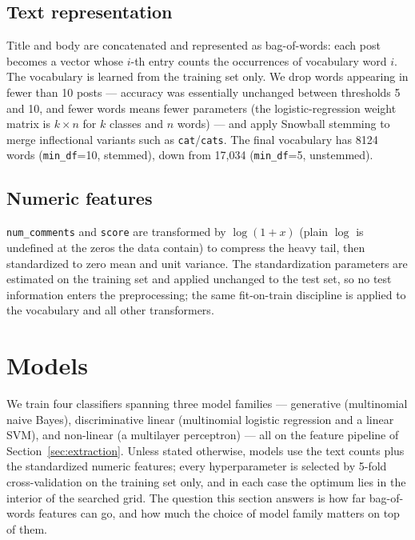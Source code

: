 \documentclass[11pt,a4paper]{article}
\begin{document}
\subsection{Text representation}
Title and body are concatenated and represented as bag-of-words: each post
becomes a vector whose $i$-th entry counts the occurrences of vocabulary word
$i$. The vocabulary is learned from the training set only. We drop words
appearing in fewer than 10 posts --- accuracy was essentially unchanged
between thresholds 5 and 10, and fewer words means fewer parameters (the
logistic-regression weight matrix is $k \times n$ for $k$ classes and $n$
words) --- and apply Snowball stemming to merge inflectional variants such as
\texttt{cat}/\texttt{cats}. The final vocabulary has 8124 words
(\texttt{min\_df}=10, stemmed), down from 17{,}034 (\texttt{min\_df}=5,
unstemmed).

\subsection{Numeric features}
\texttt{num\_comments} and \texttt{score} are transformed by $\log(1+x)$
(plain $\log$ is undefined at the zeros the data contain) to compress the
heavy tail, then standardized to zero mean and unit variance. The
standardization parameters are estimated on the training set and applied
unchanged to the test set, so no test information enters the preprocessing;
the same fit-on-train discipline is applied to the vocabulary and all other
transformers.
\section{Models}
\label{sec:models}
We train four classifiers spanning three model families --- generative
(multinomial naive Bayes), discriminative linear (multinomial logistic
regression and a linear SVM), and non-linear (a multilayer perceptron) ---
all on the feature pipeline of Section~\ref{sec:extraction}. Unless stated
otherwise, models use the text counts plus the standardized numeric
features; every hyperparameter is selected by 5-fold cross-validation on
the training set only, and in each case the optimum lies in the interior
of the searched grid. The question this section answers is how far
bag-of-words features can go, and how much the choice of model family
matters on top of them.
\end{document}
